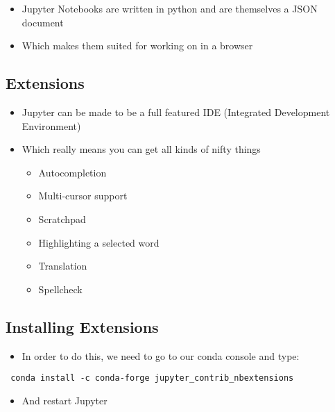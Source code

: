 \documentclass[10pt,parskip=half,
	toc=sectionentrywithdots,
	bibliography=totocnumbered,
	captions=tableheading,numbers=noendperiod]{scrartcl}
\providecommand{\tightlist}{%
  \setlength{\itemsep}{0pt}\setlength{\parskip}{0pt}}
\begin{document}
\begin{itemize}
\tightlist
\item
  Jupyter Notebooks are written in python and are themselves a JSON
  document
\end{itemize}

\begin{itemize}
\tightlist
\item
  Which makes them suited for working on in a browser
\end{itemize}

\hypertarget{extensions}{%
\subsection{Extensions}\label{extensions}}

\begin{itemize}
\tightlist
\item
  Jupyter can be made to be a full featured IDE (Integrated Development
  Environment)
\item
  Which really means you can get all kinds of nifty things

  \begin{itemize}
  \tightlist
  \item
    Autocompletion
  \item
    Multi-cursor support
  \item
    Scratchpad
  \item
    Highlighting a selected word
  \item
    Translation
  \item
    Spellcheck
  \end{itemize}
\end{itemize}

\hypertarget{installing-extensions}{%
\subsection{Installing Extensions}\label{installing-extensions}}

\begin{itemize}
\tightlist
\item
  In order to do this, we need to go to our conda console and type:
\end{itemize}

\begin{verbatim}
 conda install -c conda-forge jupyter_contrib_nbextensions 
\end{verbatim}

\begin{itemize}
\tightlist
\item
  And restart Jupyter
\end{itemize}
\end{document}
